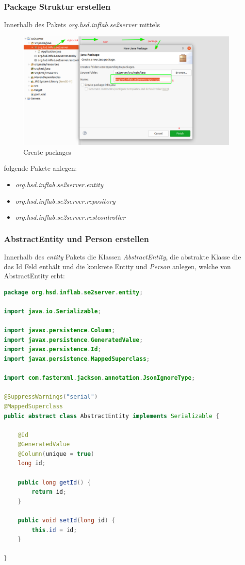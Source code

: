 \documentclass[11pt]{scrartcl}
\begin{document}
\subsubsection{Package Struktur erstellen}
\label{sec:createpackagestructure}
Innerhalb des Pakets \textit{org.hsd.inflab.se2server} mittels
\begin{figure}[!ht]
    \includegraphics[width=\linewidth]{images/eclipse13_createpackages.png}
    \caption{Create packages}
    \label{fig:createpackages}
\end{figure}

folgende Pakete anlegen:
\begin{itemize}
    \item \textit{org.hsd.inflab.se2server.entity}
    \item \textit{org.hsd.inflab.se2server.repository}
    \item \textit{org.hsd.inflab.se2server.restcontroller}
\end{itemize}

\newpage
\subsubsection{AbstractEntity und Person erstellen}
\label{sec:createentities}
Innerhalb des \textit{entity} Pakets die Klassen \textit{AbstractEntity}, die abstrakte Klasse 
die das Id Feld enthält und die konkrete Entity 
und \textit{Person} anlegen, welche von AbstractEntity erbt:
\begin{lstlisting}[language=java]
package org.hsd.inflab.se2server.entity;

import java.io.Serializable;

import javax.persistence.Column;
import javax.persistence.GeneratedValue;
import javax.persistence.Id;
import javax.persistence.MappedSuperclass;

import com.fasterxml.jackson.annotation.JsonIgnoreType;

@SuppressWarnings("serial")
@MappedSuperclass
public abstract class AbstractEntity implements Serializable {

    @Id
    @GeneratedValue
    @Column(unique = true)
    long id;

    public long getId() {
        return id;
    }

    public void setId(long id) {
        this.id = id;
    }
    
}
\end{lstlisting}
\end{document}

